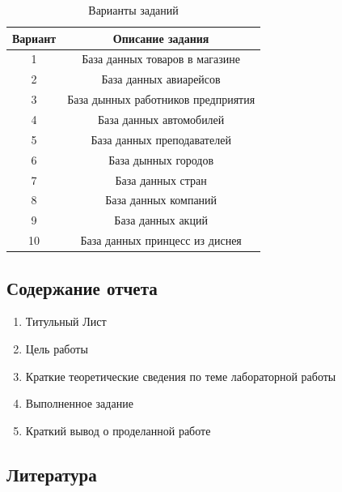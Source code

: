 \documentclass[a4paper]{article}
\begin{document}
\begin{table}[h]
      \caption{Варианты заданий}
      \begin{center}\label{tab:tasks}
      \begin{tabular}{|c|c|}
        \hline
        Вариант & Описание задания \\
        \hline
        1 & База данных товаров в магазине\\
        2 & База данных авиарейсов\\
        3 & База дынных работников предприятия\\
        4 & База данных автомобилей\\
        5 & База данных преподавателей\\
        6 & База дынных городов\\
        7 & База данных стран\\
        8 & База данных компаний\\
        9 & База данных акций\\
        10 & База данных принцесс из диснея \\
        \hline
      \end{tabular}
    \end{center}
\end{table}


\newpage
\subsection{Содержание отчета}
\begin{enumerate}
  \item Титульный Лист
  \item Цель работы
  \item Краткие теоретические сведения по теме лабораторной работы
  \item Выполненное задание
  \item Краткий вывод о проделанной работе
\end{enumerate}

\subsection{Литература}
\end{document}

